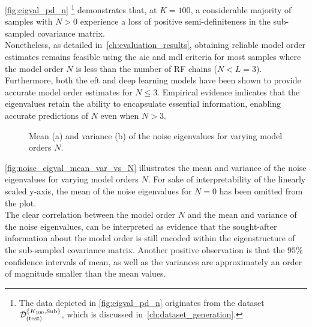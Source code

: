 \autoref{fig:eigval_pd_n}%
\footnote{The data depicted in \autoref{fig:eigval_pd_n} originates from the dataset \( \mathcal{D}^{\{K_{100},\text{Sub}\}}_{(\text{test})} \), which is discussed in~\autoref{ch:dataset_generation}.}
demonstrates that, at \( K = 100 \), a considerable majority of samples with \( N > 0 \)
experience a loss of positive semi-definiteness in the sub-sampled covariance matrix. \\
Nonetheless, as detailed in~\autoref{ch:evaluation_results}, obtaining reliable model order estimates remains feasible
using the \gls{aic} and \gls{mdl} criteria for most samples where the model order \( N \) is less than the number of RF chains (\( N < L = 3 \)). Furthermore, both the \gls{eft} and deep learning models have been shown to provide accurate model order estimates for \( N \leq 3 \). Empirical evidence indicates that
the eigenvalues retain the ability to encapsulate essential information, enabling accurate predictions of \( N \) even when \( N > 3 \).


\begin{figure}[H]
    \centering
    \caption{
        Mean (a) and variance (b) of the noise eigenvalues for varying model orders \( N \).
    }
    \label{fig:noise_eigval_mean_var_vs_N}
\end{figure}

\autoref{fig:noise_eigval_mean_var_vs_N} illustrates the mean and variance of the noise eigenvalues for varying model orders \( N \).
For sake of interpretability of the linearly scaled y-axis, the mean of the noise eigenvalues for \( N = 0 \) has been omitted from
the plot. \\
The clear correlation between the model order \( N \) and the mean and variance of the noise eigenvalues, can be interpreted
as evidence that the sought-after information about the model order is still encoded within the eigenstructure of the sub-sampled
covariance matrix. Another positive observation is that the \( 95\% \) confidence intervals of mean, as well as the variances
are approximately an order of magnitude smaller than the mean values.

